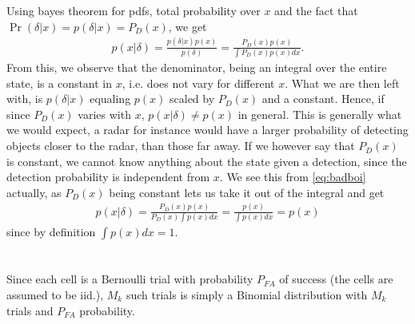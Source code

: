 \documentclass[]{article}
\title{}
\author{Sigurd Totland | MTTK}
\begin{document}
\maketitle

\section{}
\subsection{}
Using bayes theorem for pdfs, total probability over $x$ and the fact that $\Pr(\delta | x) = p(\delta | x) = P_D(x)$, we get
\begin{equation}\begin{aligned}
\label{eq:badboi}
p(x | \delta ) =  \frac{p(\delta | x) p(x)}{p(\delta)} = \frac{P_D(x)p(x)}{\int P_D(x) p(x) dx}.
\end{aligned}\end{equation}
From this, we observe that the denominator, being an integral over the entire state, is a constant in $x$, i.e. does not vary for different $x$. What we are then left with, is $p(\delta | x)$ equaling $p(x)$ scaled by $P_D(x)$ and a constant. Hence, if since $P_D(x)$ varies with $x$, $p(x | \delta) \neq p(x)$ in general. This is generally what we would expect, a radar for instance would have a larger probability of detecting objects closer to the radar, than those far away. If we however say that $P_D(x)$ is constant, we cannot know anything about the state given a detection, since the detection probability is independent from $x$. We see this from \eqref{eq:badboi} actually, as $P_D(x)$ being constant lets us take it out of the integral and get
\begin{equation}\begin{aligned}
p(x | \delta ) =  \frac{P_D(x)p(x)}{P_D(x) \int p(x) dx} = \frac{p(x)}{\int p(x) dx} = p(x)
\end{aligned}\end{equation}
since by definition $\int p(x) dx = 1$.

\section{}
\subsection{}
Since each cell is a Bernoulli trial with probability $P_{FA}$ of success (the cells are assumed to be iid.), $M_k$ such trials is simply a Binomial distribution with $M_k$ trials and $P_{FA}$ probability.
\end{document}
